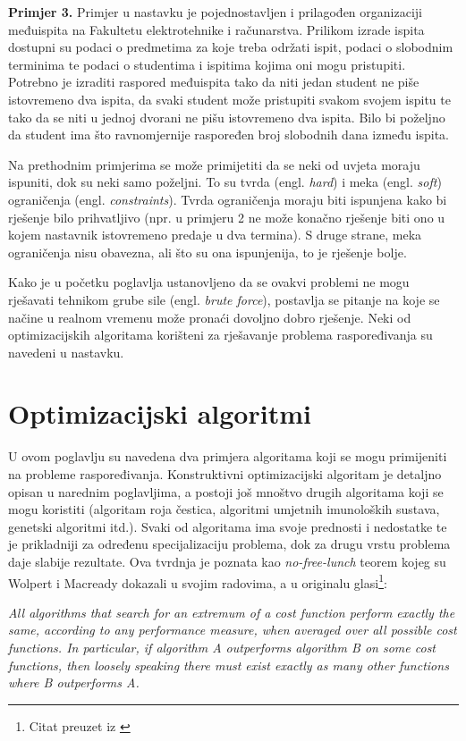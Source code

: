 \documentclass[times, utf8, zavrsni]{fer}
\begin{document}
\textbf{Primjer 3.}
Primjer u nastavku je pojednostavljen i prilagođen organizaciji međuispita na Fakultetu elektrotehnike i računarstva.
Prilikom izrade ispita dostupni su podaci o predmetima za koje treba održati ispit, podaci o slobodnim terminima te
podaci o studentima i ispitima kojima oni mogu pristupiti. Potrebno je izraditi raspored međuispita tako da niti jedan
student ne piše istovremeno dva ispita, da svaki student može pristupiti svakom svojem ispitu
te tako da se niti u jednoj dvorani ne pišu istovremeno dva ispita. Bilo bi poželjno
da student ima što ravnomjernije raspoređen broj slobodnih dana između ispita.

Na prethodnim primjerima se može primijetiti da se neki od uvjeta moraju ispuniti, dok su neki samo poželjni. To su tvrda
(engl. \textit{hard}) i meka (engl. \textit{soft}) ograničenja (engl. \textit{constraints}). Tvrda ograničenja moraju biti ispunjena kako bi rješenje bilo prihvatljivo (npr. u primjeru 2 ne može konačno rješenje biti ono u kojem nastavnik istovremeno predaje u dva termina). S druge strane, meka ograničenja nisu obavezna, ali što su ona ispunjenija, to je rješenje bolje.

Kako je u početku poglavlja ustanovljeno da se ovakvi problemi ne mogu rješavati tehnikom grube sile (engl. \textit{brute force}), postavlja
se pitanje na koje se načine u realnom vremenu može pronaći dovoljno dobro rješenje. Neki od optimizacijskih algoritama korišteni
za rješavanje problema raspoređivanja su navedeni u nastavku.

\section{Optimizacijski algoritmi}
U ovom poglavlju su navedena dva primjera algoritama koji se mogu primijeniti na probleme raspoređivanja. Konstruktivni optimizacijski
algoritam je detaljno opisan u narednim poglavljima, a postoji još mnoštvo drugih algoritama koji se mogu koristiti (algoritam roja
čestica, algoritmi umjetnih imunoloških sustava, genetski algoritmi itd.). Svaki od algoritama ima svoje prednosti i nedostatke te je
prikladniji za određenu specijalizaciju problema, dok za drugu vrstu problema daje slabije rezultate. Ova tvrdnja je poznata kao
\emph{no-free-lunch} teorem kojeg su Wolpert i Macready dokazali u svojim radovima, a u originalu glasi\footnote{Citat preuzet iz \cite{cupic2013prirodom}}:

\begin{framed}
\emph{All algorithms that search for an extremum of a cost function perform exactly the same, according to any performance measure,
when averaged over all possible cost functions. In particular, if algorithm A outperforms algorithm B on some cost functions, then
loosely speaking there must exist exactly as many other functions where B outperforms A.}
\end{framed}
\end{document}
